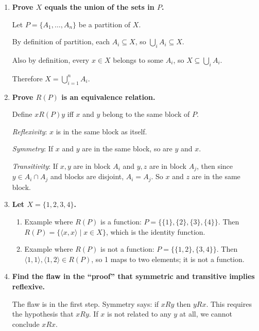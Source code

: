 \documentclass[11pt,openany]{book}
\begin{document}
\begin{enumerate}[{0.}1. ]
Hence the distinct classes are disjoint and cover $X$, forming a partition.

\item \textbf{Prove $X$ equals the union of the sets in $P$.}

Let $P = \{A_1,\ldots,A_n\}$ be a partition of $X$.

By definition of partition, each $A_i \subseteq X$, so $\bigcup_i A_i \subseteq X$.

Also by definition, every $x \in X$ belongs to some $A_i$, so $X \subseteq \bigcup_i A_i$.

Therefore $X = \bigcup_{i=1}^n A_i$.

\item \textbf{Prove $R(P)$ is an equivalence relation.}

Define $x R(P) y$ iff $x$ and $y$ belong to the same block of $P$.

\textit{Reflexivity}: $x$ is in the same block as itself.

\textit{Symmetry}: If $x$ and $y$ are in the same block, so are $y$ and $x$.

\textit{Transitivity}: If $x,y$ are in block $A_i$ and $y,z$ are in block $A_j$, then since $y \in A_i \cap A_j$ and blocks are disjoint, $A_i = A_j$. So $x$ and $z$ are in the same block.

\item \textbf{Let $X = \{1,2,3,4\}$.}

\begin{enumerate}
\item Example where $R(P)$ is a function: $P = \{\{1\},\{2\},\{3\},\{4\}\}$. Then $R(P) = \{\langle x,x\rangle \mid x \in X\}$, which is the identity function.

\item Example where $R(P)$ is not a function: $P = \{\{1,2\},\{3,4\}\}$. Then $\langle 1,1\rangle,\langle 1,2\rangle \in R(P)$, so 1 maps to two elements; it is not a function.
\end{enumerate}

\item \textbf{Find the flaw in the ``proof'' that symmetric and transitive implies reflexive.}

The flaw is in the first step. Symmetry says: if $x R y$ then $y R x$. This requires the hypothesis that $x R y$. If $x$ is not related to any $y$ at all, we cannot conclude $x R x$.


\end{enumerate}
\end{document}
